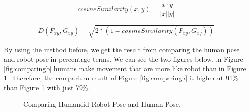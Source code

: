 \begin{equation}
    \label{eq:cosinesimilarity}
    cosineSimilarity(x,y) = \frac{x \cdot y}{|x||y|}
\end{equation}
  
\begin{equation}
    \label{eq:euclideandistance}
    D(F_{xy}, G_{xy}) = \sqrt{2 * (1 - cosineSimilarity(F_{xy}, G_{xy}))}
\end{equation}

By using the method before, we get the result from comparing the human pose and robot pose in percentage terms.
We can see the two figures below, in Figure \ref{fig:comparingb} humans make movement that are more like robot than in Figure \ref{fig:comparinga}.
Therefore, the comparison result of Figure \ref{fig:comparingb} is higher at 91\% than Figure \ref{fig:comparinga} with just 79\%.

\begin{figure}
\centering
{}
\hfil
{}
\caption{Comparing Humanoid Robot Pose and Human Pose.}
\label{fig:comparinga}
\end{figure}

